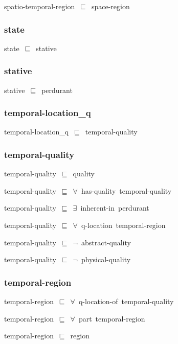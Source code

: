 \documentclass{article}
\begin{document}
spatio-temporal-region~\ensuremath{\sqsubseteq}~space-region~

\subsubsection*{state}

state~\ensuremath{\sqsubseteq}~stative~

\subsubsection*{stative}

stative~\ensuremath{\sqsubseteq}~perdurant~

\subsubsection*{temporal-location_q}

temporal-location\_q~\ensuremath{\sqsubseteq}~temporal-quality~

\subsubsection*{temporal-quality}

temporal-quality~\ensuremath{\sqsubseteq}~quality~

temporal-quality~\ensuremath{\sqsubseteq}~\ensuremath{\forall}~has-quality~temporal-quality~

temporal-quality~\ensuremath{\sqsubseteq}~\ensuremath{\exists}~inherent-in~perdurant~

temporal-quality~\ensuremath{\sqsubseteq}~\ensuremath{\forall}~q-location~temporal-region~

temporal-quality~\ensuremath{\sqsubseteq}~\ensuremath{\lnot}~abstract-quality

temporal-quality~\ensuremath{\sqsubseteq}~\ensuremath{\lnot}~physical-quality

\subsubsection*{temporal-region}

temporal-region~\ensuremath{\sqsubseteq}~\ensuremath{\forall}~q-location-of~temporal-quality~

temporal-region~\ensuremath{\sqsubseteq}~\ensuremath{\forall}~part~temporal-region~

temporal-region~\ensuremath{\sqsubseteq}~region~
\end{document}
